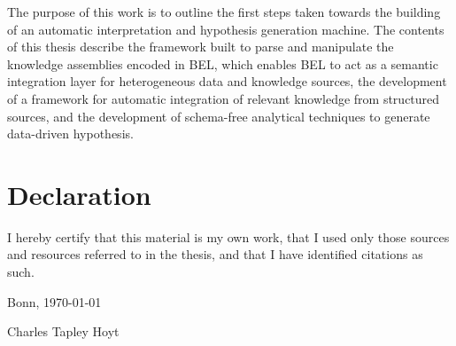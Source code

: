 \documentclass[twoside, 12pt,  footinclude=true,  headinclude=true,  cleardoublepage=empty]{scrbook}
\begin{document}
The purpose of this work is to outline the first steps taken towards the building of an automatic interpretation and hypothesis generation machine. The contents of this thesis describe the framework built to parse and manipulate the knowledge assemblies encoded in \ac{BEL}, which enables \ac{BEL} to act as a semantic integration layer for heterogeneous data and knowledge sources, the development of a framework for automatic integration of relevant knowledge from structured sources, and the development of schema-free analytical techniques to generate data-driven hypothesis.

\mainmatter













\printbibliography
	
\backmatter

\chapter*{Declaration}
I hereby certify that this material is my own work, that I used only those sources and resources referred to in the thesis, and that I have identified citations as such.
		
\vspace{0.3in}

\noindent Bonn, \today

\vspace{1in}

\noindent Charles Tapley Hoyt
\end{document}
